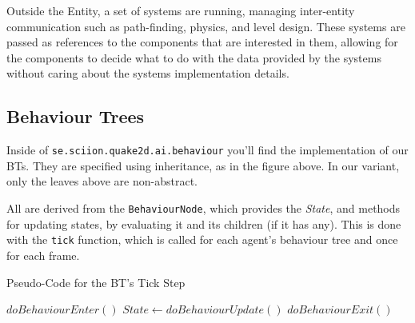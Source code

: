 \documentclass[a4paper, twocolumn]{article}
\begin{document}
        Outside the Entity, a set of systems are running, managing inter-entity communication such as path-finding, physics, and level design. These systems are passed as references to the components that are interested in them, allowing for the components to decide what to do with the data provided by the systems without caring about the systems implementation details. 


        \subsection{Behaviour Trees} \label{sec:behaviour_trees_implementation}

        Inside of \texttt{se.sciion.quake2d.ai.behaviour} you'll find the implementation of our BTs. They are specified using inheritance, as in the figure above. In our variant, only the leaves above are non-abstract.

        All are derived from the \texttt{BehaviourNode}, which provides the \emph{State}, and methods for updating states, by evaluating it and its children (if it has any). This is done with the \texttt{tick} function, which is called for each agent's behaviour tree and once for each frame.

        \begin{algorithm}[H]
            \caption{Pseudo-Code for the BT's Tick Step}
            \label{alg:behaviour_tree_update}
            \begin{algorithmic}
                    \STATE \(doBehaviourEnter()\)
                \ENDIF
                \STATE \(State \leftarrow doBehaviourUpdate()\)
                    \STATE \(doBehaviourExit()\)
                \ENDIF
            \end{algorithmic}
        \end{algorithm}
\end{document}
